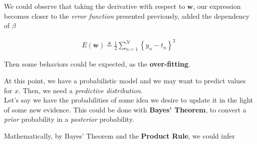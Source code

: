 \begin{frame}{\insertsubsection}
We could observe that taking the derivative with respect to $\mathbf{w}$, our expression becomes closer to the \textit{error function} presented previously, added the dependency of $\beta$

\begin{align*}
	E(\mathbf{w}) \triangleq \frac{1}{2} \sum_{n=1}^N \left\{ y_n -  t_n \right\}^2
\end{align*}

Then some behaviors could be expected, as the \textbf{over-fitting}.


%
\end{frame}

\begin{frame}{\insertsubsection}

At this point, we have a probabilistic model and we may want to predict values for $x$. Then, we need a \textit{predictive distribution}. \\
\vspace{1em}
Let's say we have the probabilities of some idea we desire to update it in the light of some new evidence. This could be done with \textbf{Bayes' Theorem}, to convert a \textit{prior} probability in a \textit{posterior} probability. \\
\end{frame}

\begin{frame}{\insertsubsection}
Mathematically, by Bayes' Theorem and the \textbf{Product Rule}, we could infer
\end{frame}

